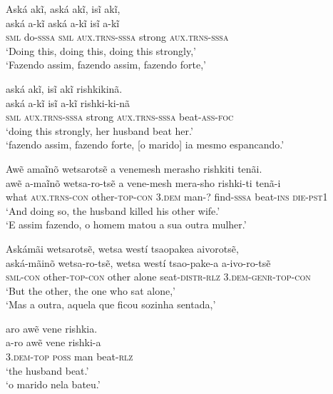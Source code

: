 \documentclass[output=paper,
modfonts,nonflat
]{langsci/langscibook}
\begin{document}
\ea Aská akĩ, aská akĩ, isĩ akĩ, \\[.3em]
\gll aská         a-kĩ             aská         a-kĩ                   isĩ    a-kĩ                   \\
     \textsc{sml} do-\textsc{sssa} \textsc{sml} \textsc{aux.trns-sssa} strong \textsc{aux.trns-sssa} \\
\glt `Doing this, doing this, doing this strongly,' \\
`Fazendo assim, fazendo assim, fazendo forte,' \\
\z

\ea aská akĩ, isĩ akĩ rishkikinã. \\[.3em]
\gll aská         a-kĩ                   isĩ    a-kĩ                   rishki-ki-nã          \\
     \textsc{sml} \textsc{aux.trns-sssa} strong \textsc{aux.trns-sssa} beat-\textsc{ass-foc} \\
\glt `doing this strongly, her husband beat her.' \\
`fazendo assim, fazendo forte, [o marido] ia mesmo espancando.' \\
\z

\ea Awẽ amaĩnõ wetsarotsẽ a venemesh merasho rishkiti tenãi. \\[.3em]
\gll awẽ  a-maĩnõ               wetsa-ro-tsẽ           a              vene-mesh mera-sho           rishki-ti         tenã-i            \\
     what \textsc{aux.trns-con} other-\textsc{top-con} \textsc{3.dem} man-?     find-\textsc{sssa} beat-\textsc{ins} \textsc{die-pst1} \\
\glt `And doing so, the husband killed his other wife.' \\
`E assim fazendo, o homem matou a sua outra mulher.' \\
\z

\ea Askámãi wetsarotsẽ, wetsa westí tsaopakea aivorotsẽ, \\[.3em]
\gll aská-mãinõ       wetsa-ro-tsẽ,          wetsa westí tsao-pake-a             a-ivo-ro-tsẽ                \\
     \textsc{sml-con} other-\textsc{top-con} other alone seat-\textsc{distr-rlz} 3.\textsc{dem-genr-top-con} \\
\glt `But the other, the one who sat alone,' \\
`Mas a outra, aquela que ficou sozinha sentada,' \\
\z

\ea aro awẽ vene rishkia. \\[.3em]
\gll a-ro               awẽ           vene rishki-a          \\
     3.\textsc{dem-top} \textsc{poss} man  beat-\textsc{rlz} \\
\glt `the husband beat.' \\
`o marido nela bateu.' \\
\z
\end{document}
